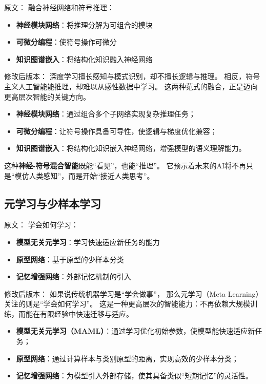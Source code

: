 原文：
融合神经网络和符号推理：

\begin{itemize}
\item \textbf{神经模块网络}：将推理分解为可组合的模块
\item \textbf{可微分编程}：使符号操作可微分
\item \textbf{知识图谱嵌入}：将结构化知识融入神经网络
\end{itemize}
修改后版本：
深度学习擅长感知与模式识别，却不擅长逻辑与推理。  
相反，符号主义人工智能能推理，却难以从感性数据中学习。  
这两种范式的融合，正是迈向更高层次智能的关键方向。

\begin{itemize}
\item \textbf{神经模块网络}：通过组合多个子网络实现复杂推理任务；
\item \textbf{可微分编程}：让符号操作具备可导性，使逻辑与梯度优化兼容；
\item \textbf{知识图谱嵌入}：将结构化知识嵌入神经网络，增强模型的语义理解能力。
\end{itemize}

这种\textbf{神经-符号混合智能}既能“看见”，也能“推理”。  
它预示着未来的AI将不再只是“模仿人类感知”，而是开始“接近人类思考”。



\subsection{元学习与少样本学习}

原文：
学会如何学习：

\begin{itemize}
\item \textbf{模型无关元学习}：学习快速适应新任务的能力
\item \textbf{原型网络}：基于原型的少样本分类
\item \textbf{记忆增强网络}：外部记忆机制的引入
\end{itemize}
修改后版本：
如果说传统机器学习是“学会做事”，  
那么元学习（Meta Learning）关注的则是“学会如何学习”。  
这是一种更高层次的智能能力：不再依赖大规模训练，而能在有限经验中快速迁移与适应。

\begin{itemize}
\item \textbf{模型无关元学习（MAML）}：通过学习优化初始参数，使模型能快速适应新任务；
\item \textbf{原型网络}：通过计算样本与类别原型的距离，实现高效的少样本分类；
\item \textbf{记忆增强网络}：为模型引入外部存储，使其具备类似“短期记忆”的灵活性。
\end{itemize}

